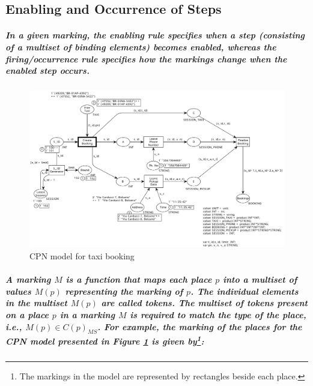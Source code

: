 \subsection*{Enabling and Occurrence of Steps}

\subparagraph{\textnormal{In a given marking, the enabling rule specifies when a step (consisting of a multiset of binding elements) becomes enabled, whereas the firing/occurrence rule specifies how the markings change when the enabled step occurs.}}

\begin{figure}[!htbp]
	\centering
	\includegraphics[scale = 0.35]{CPN_Taxi_Booking_initial_step.pdf}
	\caption{CPN model for taxi booking}
	\label{fig:CPN_Taxi_Booking_initial_step}
\end{figure}

\subparagraph*{\textnormal{A \textbf{\textit{marking}} $\mathit{M}$ is a function that maps each place $\mathit{p}$ into a multiset of values $\mathit{M(p)}$ representing the marking of $\mathit{p}$. The individual elements in the multiset $\mathit{M(p)}$ are called \textbf{\textit{tokens}}. The multiset of tokens present on a place $\mathit{p}$ in a marking $\mathit{M}$ is required to match the type of the place, i.e., $\mathit{M(p) \in C(p)_{MS}}$. For example, the marking of the places for the CPN model presented in Figure \ref{fig:CPN_Taxi_Booking_initial_step} is given by\footnote{The markings in the model are represented by rectangles beside each place.}:}}

